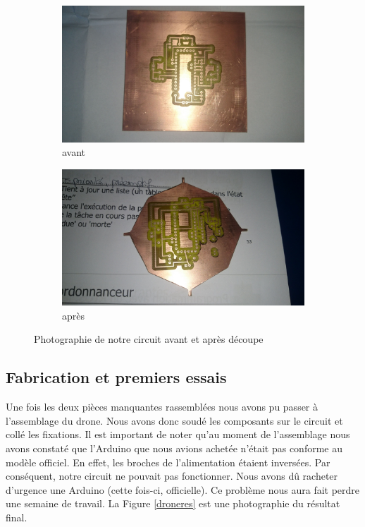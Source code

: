 \documentclass[a4paper,10pt]{report}
\begin{document}
	\begin{figure}[htbp]
	  \begin{subfigure}{.5\textwidth}
	    \centering
	    \includegraphics[scale=0.07]{img/carte_avant.jpg}
	    \caption{avant}
	    \label{circuitavant}
	  \end{subfigure}%
	  \begin{subfigure}{.5\textwidth}
	    \centering
	    \includegraphics[scale=0.07]{img/carte_apres.jpg}
	    \caption{après}
	    \label{circuitapres}
	  \end{subfigure}
	  \caption{Photographie de notre circuit avant et après découpe}
	  \label{circuit}
	\end{figure}
      
	\subsection{Fabrication et premiers essais}
	  Une fois les deux pièces manquantes rassemblées nous avons pu passer 
à l'assemblage du drone. Nous avons donc soudé les composants sur le circuit et 
collé les fixations. Il est important de noter qu'au moment de l'assemblage 
nous avons constaté que l'Arduino que nous avions achetée n'était pas conforme 
au modèle officiel. En effet, les broches de l'alimentation étaient inversées. 
Par conséquent, notre circuit ne pouvait pas fonctionner. Nous avons dû 
racheter d'urgence une Arduino (cette fois-ci, officielle). Ce problème nous 
aura fait perdre une semaine de travail. La Figure \ref{droneres} est une 
photographie du résultat final.
\end{document}
